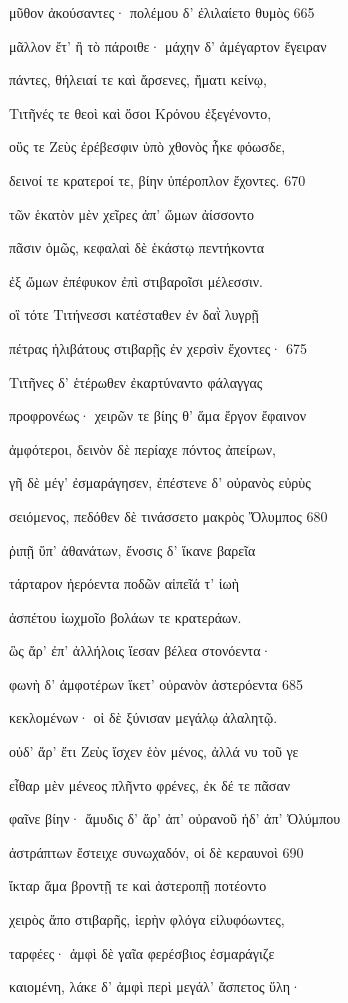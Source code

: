 μῦθον ἀκούσαντες· πολέμου δ' ἐλιλαίετο θυμὸς \num{665} 

μᾶλλον ἔτ' ἢ τὸ πάροιθε· μάχην δ' ἀμέγαρτον ἔγειραν 

πάντες, θήλειαί τε καὶ ἄρσενες, ἤματι κείνῳ,

Τιτῆνές τε θεοὶ καὶ ὅσοι Κρόνου ἐξεγένοντο,

οὕς τε Ζεὺς ἐρέβεσφιν ὑπὸ χθονὸς ἧκε φόωσδε,

δεινοί τε κρατεροί τε, βίην ὑπέροπλον ἔχοντες. \num{670}

τῶν ἑκατὸν μὲν χεῖρες ἀπ' ὤμων ἀίσσοντο

πᾶσιν ὁμῶς, κεφαλαὶ δὲ ἑκάστῳ πεντήκοντα

ἐξ ὤμων ἐπέφυκον ἐπὶ στιβαροῖσι μέλεσσιν.

οἳ τότε Τιτήνεσσι κατέσταθεν ἐν δαῒ λυγρῇ

πέτρας ἠλιβάτους στιβαρῇς ἐν χερσὶν ἔχοντες· \num{675} 

Τιτῆνες δ' ἑτέρωθεν ἐκαρτύναντο φάλαγγας

προφρονέως· χειρῶν τε βίης θ' ἅμα ἔργον ἔφαινον 

ἀμφότεροι, δεινὸν δὲ περίαχε πόντος ἀπείρων,

γῆ δὲ μέγ' ἐσμαράγησεν, ἐπέστενε δ' οὐρανὸς εὐρὺς

σειόμενος, πεδόθεν δὲ τινάσσετο μακρὸς Ὄλυμπος \num{680}

ῥιπῇ ὕπ' ἀθανάτων, ἔνοσις δ' ἵκανε βαρεῖα

τάρταρον ἠερόεντα ποδῶν αἰπεῖά τ' ἰωὴ

ἀσπέτου ἰωχμοῖο βολάων τε κρατεράων. 

ὣς ἄρ' ἐπ' ἀλλήλοις ἵεσαν βέλεα στονόεντα· 

φωνὴ δ' ἀμφοτέρων ἵκετ' οὐρανὸν ἀστερόεντα \num{685}

κεκλομένων· οἱ δὲ ξύνισαν μεγάλῳ ἀλαλητῷ. 

οὐδ' ἄρ' ἔτι Ζεὺς ἴσχεν ἑὸν μένος, ἀλλά νυ τοῦ γε

εἶθαρ μὲν μένεος πλῆντο φρένες, ἐκ δέ τε πᾶσαν

φαῖνε βίην· ἄμυδις δ' ἄρ' ἀπ' οὐρανοῦ ἠδ' ἀπ' Ὀλύμπου 

ἀστράπτων ἔστειχε συνωχαδόν, οἱ δὲ κεραυνοὶ \num{690} 

ἴκταρ ἅμα βροντῇ τε καὶ ἀστεροπῇ ποτέοντο

χειρὸς ἄπο στιβαρῆς, ἱερὴν φλόγα εἰλυφόωντες, 

ταρφέες· ἀμφὶ δὲ γαῖα φερέσβιος ἐσμαράγιζε 

καιομένη, λάκε δ' ἀμφὶ περὶ μεγάλ' ἄσπετος ὕλη·

